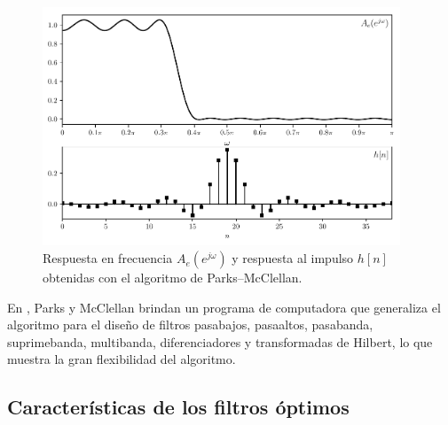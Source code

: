 \documentclass[a4paper]{report}
\begin{document}
\begin{figure}[!htb]
 \begin{center}
 \includegraphics[width=0.95\textwidth]{figuras/filter_design_fir_optimal_pm_implementation_plots_Ae_h.pdf}
 \caption{\label{fig:filter_design_fir_optimal_pm_implementation_plots_Ae_h} Respuesta en frecuencia \(A_e(e^{j\omega})\) y respuesta al impulso \(h[n]\) obtenidas con el algoritmo de Parks--McClellan.}
 \end{center}
\end{figure}

En \cite{mcclellan1973computer}, Parks y McClellan brindan un programa de computadora que generaliza el algoritmo para el diseño de filtros pasabajos, pasaaltos, pasabanda, suprimebanda, multibanda, diferenciadores y transformadas de Hilbert, lo que muestra la gran flexibilidad del algoritmo.

\subsection{Características de los filtros óptimos}
\end{document}
